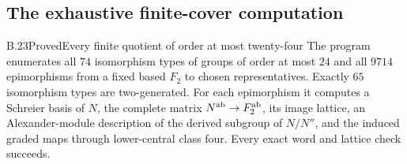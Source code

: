 \subsection{The exhaustive finite-cover computation}

\begin{statement}{B.23}{Proved}{Every finite quotient of order at most twenty-four}
The program enumerates all $74$ isomorphism types of groups
of order at most $24$ and all $9714$ epimorphisms from a
fixed based $F_2$ to chosen representatives. Exactly $65$
isomorphism types are two-generated. For each epimorphism
it computes a Schreier basis of $N$, the complete matrix
$N^{\mathrm{ab}}\to F_2^{\mathrm{ab}}$, its image lattice, an Alexander-module
description of the derived subgroup of $N/N''$, and the induced graded maps
through lower-central class four. Every exact word and
lattice check succeeds.
\end{statement}
